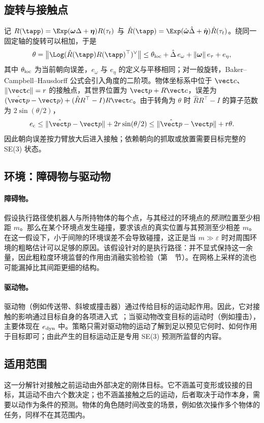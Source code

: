 \subsection{旋转与接触点}
\label{app:budget_rotation}
记 $R(\tapp)=\Exp(\boldsymbol\omega\Delta+\boldsymbol\eta)R(\tau_t)$ 与 $\hat R(\tapp)=\Exp(\hat{\boldsymbol\omega}\hat\Delta+\hat{\boldsymbol\eta})\hat R(\tau_t)$。绕同一固定轴的旋转可以相加，于是
\begin{equation}
\theta=\big\|\Log(\hat R(\tapp)R(\tapp)^\top)^{\vee}\big\|
\le\theta_{\rm loc}+\hat\Delta\,e_\omega+\|\boldsymbol\omega\|\,e_\tau+e_\eta ,
\label{eq:budget_rotation}
\end{equation}
其中 $\theta_{\rm loc}$ 为当前朝向误差，$e_\omega$ 与 $e_\eta$ 的定义与平移相同；对一般旋转，Baker--Campbell--Hausdorff 公式会引入角度的二阶项。物体坐标系中位于 $\vect c$、$\|\vect c\|=r$ 的接触点，其世界位置为 $\vect p+R\vect c$，误差为 $(\hat{\vect p}-\vect p)+(\hat RR^\top-I)R\vect c$。由于转角为 $\theta$ 时 $\hat RR^\top-I$ 的算子范数为 $2\sin(\theta/2)$，
\begin{equation}
e_{\rm c}\le\|\hat{\vect p}-\vect p\|+2r\sin(\theta/2)\le\|\hat{\vect p}-\vect p\|+r\theta .
\label{eq:contact_app}
\end{equation}
因此朝向误差按力臂放大后进入接触；依赖朝向的抓取或放置需要目标完整的 SE(3) 状态。

\subsection{环境：障碍物与驱动物}
\label{app:budget_context}
\paragraph{障碍物。}假设执行路径使机器人与所持物体的每个点，与其经过的环境点的\emph{预测}位置至少相距 $m$。那么在某个环境点发生碰撞，要求该点的真实位置与其预测至少相差 $m$。在这一假设下，小于间隙的环境误差不会导致碰撞，这正是当 $m\gg\varepsilon$ 时对周围环境的粗略估计可以足够的原因。该假设针对的是执行路径：\ours 并不显式保持这一余量，因此粗粒度环境监督的作用由消融实验检验（第~~节）。在网格上采样的流也可能漏掉比其间距更细的结构。

\paragraph{驱动物。}驱动物（例如传送带、斜坡或撞击器）通过传给目标的运动起作用。因此，它对接触的影响通过目标自身的各项进入式~；当驱动物改变目标的运动时（例如撞击），主要体现在 $e_{\rm dyn}$ 中。策略只需对驱动物的运动了解到足以预见它何时、如何作用于目标即可；由此产生的目标运动正是专用 SE(3) 预测所监督的内容。

\subsection{适用范围}
\label{app:budget_scope}
这一分解针对接触之前运动由外部决定的刚体目标。它不涵盖可变形或铰接的目标，其运动不由六个数决定；也不涵盖接触之后的运动，后者取决于动作本身，需要以动作为条件的预测。物体的角色随时间改变的场景，例如依次操作多个物体的任务，同样不在其范围内。
